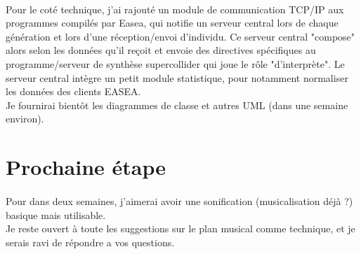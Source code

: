 \documentclass{article}
\begin{document}
    \paragraph{} %
    \label{par:}
      Pour le coté technique, j'ai rajouté un module de communication TCP/IP aux
      programmes compilés par Easea, qui notifie un serveur central lors de chaque
      génération et lors d'une réception/envoi d'individu. Ce serveur central "compose"
      alors selon les données qu'il reçoit et envoie des directives spécifiques au
      programme/serveur de synthèse supercollider qui joue le rôle "d'interprète".
      Le serveur central intègre un petit module statistique, pour notamment
      normaliser les données des clients EASEA.\\
      Je fournirai bientôt les diagrammes de classe et autres UML (dans une semaine
      environ).

  \section{Prochaine étape} %
  \label{sec:Prochaines étapes}
    \paragraph{} %
    \label{par:}
      Pour dans deux semaines, j'aimerai avoir une sonification (musicalisation déjà
      ?) basique mais utilisable.\\
      Je reste ouvert à toute les suggestions sur le plan musical comme technique,
      et je serais ravi de répondre a vos questions.
\end{document}
